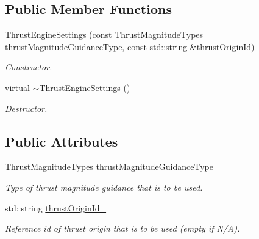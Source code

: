 \subsection*{Public Member Functions}
\begin{DoxyCompactItemize}
\item 
\hyperlink{classtudat_1_1simulation__setup_1_1ThrustEngineSettings_a48e8643cb6be9d8473ff11746cad20d9}{Thrust\+Engine\+Settings} (const Thrust\+Magnitude\+Types thrust\+Magnitude\+Guidance\+Type, const std\+::string \&thrust\+Origin\+Id)
\begin{DoxyCompactList}\small\item\em Constructor. \end{DoxyCompactList}\item 
virtual \hyperlink{classtudat_1_1simulation__setup_1_1ThrustEngineSettings_afe2e50cfc670364359367687aadb56c2}{$\sim$\+Thrust\+Engine\+Settings} ()\hypertarget{classtudat_1_1simulation__setup_1_1ThrustEngineSettings_afe2e50cfc670364359367687aadb56c2}{}\label{classtudat_1_1simulation__setup_1_1ThrustEngineSettings_afe2e50cfc670364359367687aadb56c2}

\begin{DoxyCompactList}\small\item\em Destructor. \end{DoxyCompactList}\end{DoxyCompactItemize}
\subsection*{Public Attributes}
\begin{DoxyCompactItemize}
\item 
Thrust\+Magnitude\+Types \hyperlink{classtudat_1_1simulation__setup_1_1ThrustEngineSettings_ac78afab964eff8963de2394bd949f830}{thrust\+Magnitude\+Guidance\+Type\+\_\+}\hypertarget{classtudat_1_1simulation__setup_1_1ThrustEngineSettings_ac78afab964eff8963de2394bd949f830}{}\label{classtudat_1_1simulation__setup_1_1ThrustEngineSettings_ac78afab964eff8963de2394bd949f830}

\begin{DoxyCompactList}\small\item\em Type of thrust magnitude guidance that is to be used. \end{DoxyCompactList}\item 
std\+::string \hyperlink{classtudat_1_1simulation__setup_1_1ThrustEngineSettings_a34d0d201a0dc045ea16ae7bc1ca3601f}{thrust\+Origin\+Id\+\_\+}\hypertarget{classtudat_1_1simulation__setup_1_1ThrustEngineSettings_a34d0d201a0dc045ea16ae7bc1ca3601f}{}\label{classtudat_1_1simulation__setup_1_1ThrustEngineSettings_a34d0d201a0dc045ea16ae7bc1ca3601f}

\begin{DoxyCompactList}\small\item\em Reference id of thrust origin that is to be used (empty if N/A). \end{DoxyCompactList}\end{DoxyCompactItemize}


